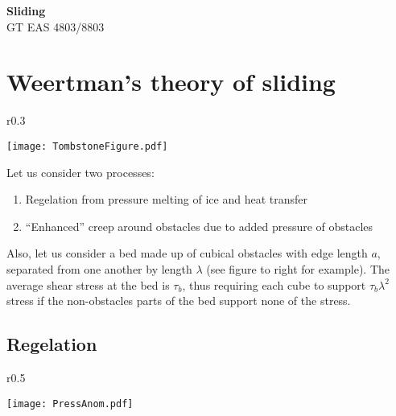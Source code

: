 \documentclass[12pt]{article}
\theoremstyle{definition}
\begin{document}
\thispagestyle{empty}

\begin{center}
{\LARGE \bf Sliding}\\
{\large GT EAS 4803/8803}\\
\end{center}

\begin{center}
\end{center}

\section{Weertman's theory of sliding}

\begin{wrapfigure}{r}{0.3\textwidth}
  \begin{center}
\texttt{[image: TombstoneFigure.pdf]}
  \end{center}
  \vspace{-20pt}
\end{wrapfigure}
Let us consider two processes:
\begin{enumerate}
\item Regelation from pressure melting of ice and heat transfer
\item ``Enhanced'' creep around obstacles due to added pressure of obstacles
\end{enumerate}

Also, let us consider a bed made up of cubical obstacles with edge length $a$, separated from one another by length $\lambda$ (see figure to right for example). The average shear stress at the bed is $\tau_b$, thus requiring each cube to support $\tau_b \lambda^2$ stress if the non-obstacles parts of the bed support none of the stress.

\subsection{Regelation}

\begin{wrapfigure}{r}{0.5\textwidth}
\vspace{-20pt}
  \begin{center}
\texttt{[image: PressAnom.pdf]}
  \end{center}
\end{wrapfigure}
\end{document}
